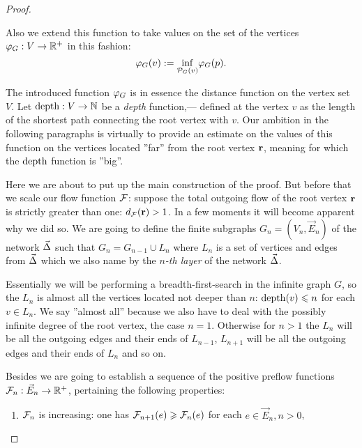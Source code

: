 \documentclass[12pt]{article}
\begin{document}
\begin{proof}
\begin{definition}
        Also we extend this function to take values on the set of the vertices $\varphi_{G}: V \to \mathbb{R}^{+}$ in this fashion:
        \[
          \varphi_{G}(v) := {\inf_{\mathcal{P}_{G}(v)}} \varphi_{G}(p).
        \]
      \end{definition}
      \begin{remark}
        The introduced function $\varphi_{G}$ is in essence the distance function on the vertex set $V$.
        Let $\operatorname{depth}: V \to \mathbb{N}$ be a \emph{depth} function,--- defined at the vertex $v$ as the length of the shortest path connecting the root vertex with
          $v$.
        Our ambition in the following paragraphs is virtually to provide an estimate on the values of this function on the vertices
          located ''far'' from the root vertex $\mathbf{r}$, meaning for which the $\operatorname{depth}$ function is ''big''. 
      \end{remark}
      Here we are about to put up the main construction of the proof.
      But before that we scale our flow function $\mathcal{F}$: suppose the total outgoing flow of the root vertex $\mathbf{r}$ is strictly greater than one:
        $d_{\mathcal{F}}(\mathbf{r}) > 1$.
      In a few moments it will become apparent why we did so.
      We are going to define the finite subgraphs $G_n = (V_n, \vec{E}_n)$ of the network $\vec{\Delta}$ such that
        $G_{n} = G_{n-1} \cup L_n$ where $L_n$ is a set of vertices and edges from $\vec{\Delta}$ which we also name by
        the \emph{$n$-th layer} of the network $\vec{\Delta}$.
      \begin{note}
        Essentially we will be performing a breadth-first-search in the infinite graph $G$, so the $L_n$ is
          almost all the vertices located not deeper than $n$: $\operatorname{depth}(v) \leqslant n$ for each $v \in L_n$.
        We say ''almost all'' because we also have to deal with the possibly infinite degree of the root vertex, the case $n = 1$.
        Otherwise for $n > 1$ the $L_n$ will be all the outgoing edges and their ends of $L_{n-1}$, $L_{n+1}$ will be
          all the outgoing edges and their ends of $L_n$ and so on.
      \end{note}
      Besides we are going to establish a sequence of the positive preflow functions $\mathcal{F}_{n}: \vec{E}_n \to \mathbb{R}^{+}$,
        pertaining the following properties:
        \begin{enumerate}[label=\textbf{P\arabic*}]
          \item \label{p1} $\mathcal{F}_{n}$ is increasing: one has $\mathcal{F}_{n+1}(e) \geqslant \mathcal{F}_{n}(e)$ for each $e \in \vec{E}_n, n > 0$,

\end{enumerate}
\end{proof}
\end{document}
